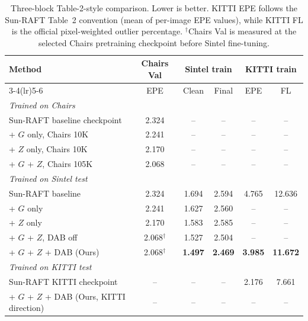 \begin{table}[t]
\centering
\small
\setlength{\tabcolsep}{6pt}
\begin{tabular}{lccccc}
\toprule
Method & Chairs Val & \multicolumn{2}{c}{Sintel train} & \multicolumn{2}{c}{KITTI train} \\
\cmidrule(lr){3-4}\cmidrule(lr){5-6}
 & EPE & Clean & Final & EPE & FL \\
\midrule
\multicolumn{6}{l}{\emph{Trained on Chairs}} \\
Sun-RAFT baseline checkpoint & 2.324 & -- & -- & -- & -- \\
+ $G$ only, Chairs 10K & 2.241 & -- & -- & -- & -- \\
+ $Z$ only, Chairs 10K & 2.170 & -- & -- & -- & -- \\
+ $G$ + $Z$, Chairs 105K & 2.068 & -- & -- & -- & -- \\
\midrule
\multicolumn{6}{l}{\emph{Trained on Sintel test}} \\
Sun-RAFT baseline & 2.324 & 1.694 & 2.594 & 4.765 & 12.636 \\
+ $G$ only & 2.241 & 1.627 & 2.560 & -- & -- \\
+ $Z$ only & 2.170 & 1.583 & 2.585 & -- & -- \\
+ $G$ + $Z$, DAB off & 2.068$^\dagger$ & 1.527 & 2.504 & -- & -- \\
+ $G$ + $Z$ + DAB (Ours) & 2.068$^\dagger$ & \textbf{1.497} & \textbf{2.469} & \textbf{3.985} & \textbf{11.672} \\
\midrule
\multicolumn{6}{l}{\emph{Trained on KITTI test}} \\
Sun-RAFT KITTI checkpoint & -- & -- & -- & 2.176 & 7.661 \\
+ $G$ + $Z$ + DAB (Ours, KITTI direction) & -- & -- & -- & -- & -- \\
\bottomrule
\end{tabular}
\caption{
Three-block Table-2-style comparison. Lower is better. KITTI EPE follows the Sun-RAFT Table~2 convention (mean of per-image EPE values), while KITTI FL is the official pixel-weighted outlier percentage.
$^\dagger$Chairs Val is measured at the selected Chairs pretraining checkpoint before Sintel fine-tuning.
}
\label{tab:three_block_results}
\end{table}

